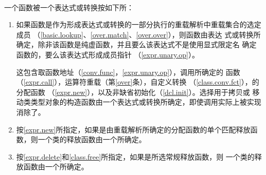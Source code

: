 \paragraph{} %
一个函数被一个表达式或转换按如下所：
\begin{enumerate}
  \item 如果函数是作为形成表达式或转换的一部分执行的重载解析中重载集合的选定成员
        （\ref{basic.lookup}、\ref{over.match}、\ref{over.over}），则函数由表达
        式或转换所确定，除非该函数是纯虚函数，并且要么该表达式不是使用显式限定名
        确定函数的，要么该表达式形成成员指针
        （\ref{expr.unary.op}）。

        \begin{note} %
          这包含取函数地址（\ref{conv.func}，\ref{expr.unary.op}），调用所确定的
          函数（\ref{expr.call}），运算符重载（第\ref{over}条），自定义转换
          （\ref{class.conv.fct}），的分配函数
          （\ref{expr.new}），以及非缺省初始化（\ref{dcl.init}）。选择用于拷贝或
          移动类类型对象的构造函数由一个表达式或转换所确定，即使调用实际上被实现
          消除了。
        \end{note}
  \item 按\ref{expr.new}所指定，如果是由重载解析所确定的分配函数的单个匹配释放函
        数，则一个类的释放函数由一个所确定。
  \item 按\ref{expr.delete}和\ref{class.free}所指定，如果是所选常规释放函数，则
        一个类的释放函数由一个所确定。
\end{enumerate}

